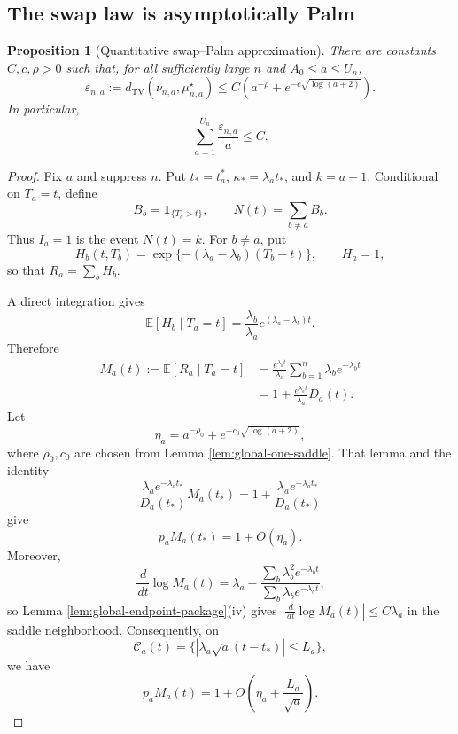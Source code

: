 \documentclass[11pt]{article}
\newtheorem{proposition}[theorem]{Proposition}
\theoremstyle{remark}
\newcommand{\Ee}{\mathbb E}
\newcommand{\one}{\mathbf 1}
\newcommand{\TV}{\mathrm{TV}}
\newcommand{\dd}{\,d}
\begin{document}
\subsection{The swap law is asymptotically Palm}

\begin{proposition}[Quantitative swap--Palm approximation]\label{prop:swap-palm}
There are constants $C,c,\rho>0$ such that, for all sufficiently large $n$ and
$A_0\le a\le U_n$,
\[
        \varepsilon_{n,a}:=
        d_{\TV}(\nu_{n,a},\mu_{n,a}^\star)
        \le C\left(a^{-\rho}+e^{-c\sqrt{\log(a+2)}}\right).
\]
In particular,
\[
        \sum_{a=1}^{U_n}\frac{\varepsilon_{n,a}}a\le C.
\]
\end{proposition}

\begin{proof}
Fix $a$ and suppress $n$.  Put
$t_*=t_a^*$, $\kappa_*=\lambda_at_*$, and $k=a-1$.  Conditional on
$T_a=t$, define
\[
        B_b=\one_{\{T_b>t\}},
        \qquad
        N(t)=\sum_{b\ne a}B_b.
\]
Thus $I_a=1$ is the event $N(t)=k$.  For $b\ne a$, put
\[
        H_b(t,T_b)=
        \exp\{-(\lambda_a-\lambda_b)(T_b-t)\},        \qquad H_a=1,
\]
so that $R_a=\sum_bH_b$.

A direct integration gives
\[
        \Ee[H_b\mid T_a=t]
        =\frac{\lambda_b}{\lambda_a}
        e^{(\lambda_a-\lambda_b)t}.
\]
Therefore
\[
\begin{aligned}
        M_a(t):=\Ee[R_a\mid T_a=t]
        &=\frac{e^{\lambda_at}}{\lambda_a}
        \sum_{b=1}^n\lambda_be^{-\lambda_bt}\\
        &=1+\frac{e^{\lambda_at}}{\lambda_a}D_a(t).
\end{aligned}
\]
Let
\[
        \eta_a=a^{-\rho_0}+e^{-c_0\sqrt{\log(a+2)}},
\]
where $\rho_0,c_0$ are chosen from Lemma \ref{lem:global-one-saddle}.
That lemma and the identity
\[
        \frac{\lambda_ae^{-\lambda_at_*}}{D_a(t_*)}M_a(t_*)
        =1+\frac{\lambda_ae^{-\lambda_at_*}}{D_a(t_*)}
\]
give
\[
        p_aM_a(t_*)=1+O(\eta_a).
\]
Moreover,
\[
        \frac{\dd}{\dd t}\log M_a(t)
        =\lambda_a-
        \frac{\sum_b\lambda_b^2e^{-\lambda_bt}}
        {\sum_b\lambda_be^{-\lambda_bt}},
\]
so Lemma \ref{lem:global-endpoint-package}(iv) gives
$|\frac{\dd}{\dd t}\log M_a(t)|\le C\lambda_a$ in the saddle
neighborhood.  Consequently, on
\[
        \mathcal C_a(t)=
        \{|\lambda_a\sqrt a(t-t_*)|\le L_a\},
\]
we have
\[
        p_aM_a(t)
        =1+O\left(\eta_a+\frac{L_a}{\sqrt a}\right).
\]


\end{proof}
\end{document}
